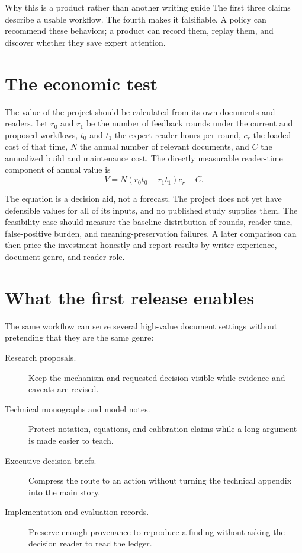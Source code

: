 \begin{takeawaybox}{Why this is a product rather than another writing guide}
The first three claims describe a usable workflow. The fourth makes it
falsifiable. A policy can recommend these behaviors; a product can record them,
replay them, and discover whether they save expert attention.
\end{takeawaybox}

\section{The economic test}

The value of the project should be calculated from its own documents and
readers. Let $r_0$ and $r_1$ be the number of feedback rounds under the current
and proposed workflows, $t_0$ and $t_1$ the expert-reader hours per round,
$c_r$ the loaded cost of that time, $N$ the annual number of relevant
documents, and $C$ the annualized build and maintenance cost. The directly
measurable reader-time component of annual value is
\begin{equation}
V = N(r_0t_0-r_1t_1)c_r-C.
\label{eq:opening-value}
\end{equation}

The equation is a decision aid, not a forecast. The project does not yet have
defensible values for all of its inputs, and no published study supplies them.
The feasibility case should measure the baseline distribution of rounds,
reader time, false-positive burden, and meaning-preservation failures. A later
comparison can then price the investment honestly and report results by writer
experience, document genre, and reader role.

\section{What the first release enables}

The same workflow can serve several high-value document settings without
pretending that they are the same genre:

\begin{description}
\item[Research proposals.] Keep the mechanism and requested decision visible
  while evidence and caveats are revised.
\item[Technical monographs and model notes.] Protect notation, equations, and
  calibration claims while a long argument is made easier to teach.
\item[Executive decision briefs.] Compress the route to an action without
  turning the technical appendix into the main story.
\item[Implementation and evaluation records.] Preserve enough provenance to
  reproduce a finding without asking the decision reader to read the ledger.
\end{description}

